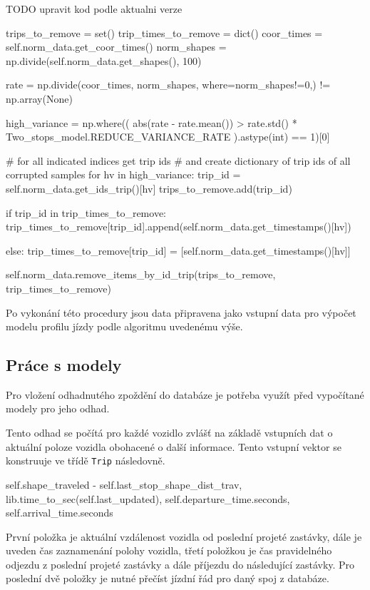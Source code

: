 TODO upravit kod podle aktualni verze
\begin{code}[frame=none]
trips_to_remove = set()
trip_times_to_remove = dict()
coor_times = self.norm_data.get_coor_times()
norm_shapes = np.divide(self.norm_data.get_shapes(), 100)


rate = np.divide(coor_times, norm_shapes, where=norm_shapes!=0,) != np.array(None)


high_variance = np.where((
    abs(rate - rate.mean()) > rate.std() * Two_stops_model.REDUCE_VARIANCE_RATE
  ).astype(int) == 1)[0]


# for all indicated indices get trip ids
# and create dictionary of trip ids of all corrupted samples
for hv in high_variance:
  trip_id = self.norm_data.get_ids_trip()[hv]
  trips_to_remove.add(trip_id)


  if trip_id in trip_times_to_remove:
    trip_times_to_remove[trip_id].append(self.norm_data.get_timestamps()[hv])


  else:
    trip_times_to_remove[trip_id] = [self.norm_data.get_timestamps()[hv]]


self.norm_data.remove_items_by_id_trip(trips_to_remove, trip_times_to_remove)
\end{code}


\bigbreak


Po vykonání této procedury jsou data připravena jako vstupní data pro výpočet modelu profilu jízdy podle algoritmu uvedenému výše.


\subsection{Práce s modely}


Pro vložení odhadnutého zpoždění do databáze je potřeba využít před vypočítané modely pro jeho odhad.


\bigbreak


Tento odhad se počítá pro každé vozidlo zvlášť na základě vstupních dat o aktuální poloze vozidla obohacené o další informace. Tento vstupní vektor se konstruuje ve třídě \verb-Trip- následovně.


\begin{code}[frame=none]
self.shape_traveled - self.last_stop_shape_dist_trav,
lib.time_to_sec(self.last_updated),
self.departure_time.seconds,
self.arrival_time.seconds
\end{code}


\bigbreak


První položka je aktuální vzdálenost vozidla od poslední projeté zastávky, dále je uveden čas zaznamenání polohy vozidla, třetí položkou je čas pravidelného odjezdu z poslední projeté zastávky a dále příjezdu do následující zastávky. Pro poslední dvě položky je nutné přečíst jízdní řád pro daný spoj z databáze.


